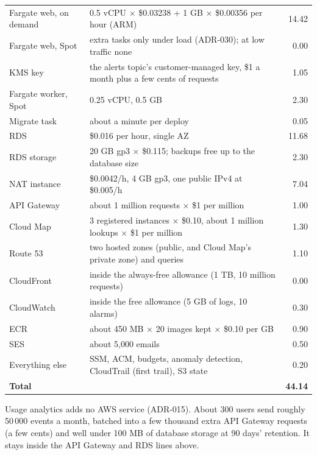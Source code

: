 {\tablefont
\begin{xltabular}{\linewidth}{@{}P{38mm} L r@{}}
  \toprule
   &  & \\
  \midrule
  \endhead
  Fargate web, on demand & 0.5 vCPU × \$0.03238 + 1 GB × \$0.00356 per hour (ARM) & 14.42\\
  Fargate web, Spot & extra tasks only under load (ADR-030); at low traffic none & 0.00\\
  KMS key & the alerts topic's customer-managed key, \$1 a month plus a few cents of requests & 1.05\\
  Fargate worker, Spot & 0.25 vCPU, 0.5 GB & 2.30\\
  Migrate task & about a minute per deploy & 0.05\\
  RDS  & \$0.016 per hour, single AZ & 11.68\\
  RDS storage & 20 GB gp3 × \$0.115; backups free up to the database size & 2.30\\
  NAT instance &  \$0.0042/h, 4 GB gp3, one public IPv4 at \$0.005/h & 7.04\\
  API Gateway & about 1 million requests × \$1 per million & 1.00\\
  Cloud Map & 3 registered instances × \$0.10, about 1 million lookups × \$1 per million & 1.30\\
  Route 53 & two hosted zones (public, and Cloud Map's private zone) and queries & 1.10\\
  CloudFront & inside the always-free allowance (1 TB, 10 million requests) & 0.00\\
  CloudWatch & inside the free allowance (5 GB of logs, 10 alarms) & 0.30\\
  ECR & about 450 MB × 20 images kept × \$0.10 per GB & 0.90\\
  SES & about 5,000 emails & 0.50\\
  Everything else & SSM, ACM, budgets, anomaly detection, CloudTrail (first trail), S3 state & 0.20\\
  \midrule
  \textbf{Total} & & \textbf{44.14}\\
  \bottomrule
\end{xltabular}}

\begin{note}
  Usage analytics adds no AWS service (ADR-015). About 300 users send roughly 50\,000 events a
  month, batched into a few thousand extra API Gateway requests (a few cents) and well under
  100 MB of database storage at 90 days' retention. It stays inside the API Gateway and RDS lines
  above.
\end{note}

